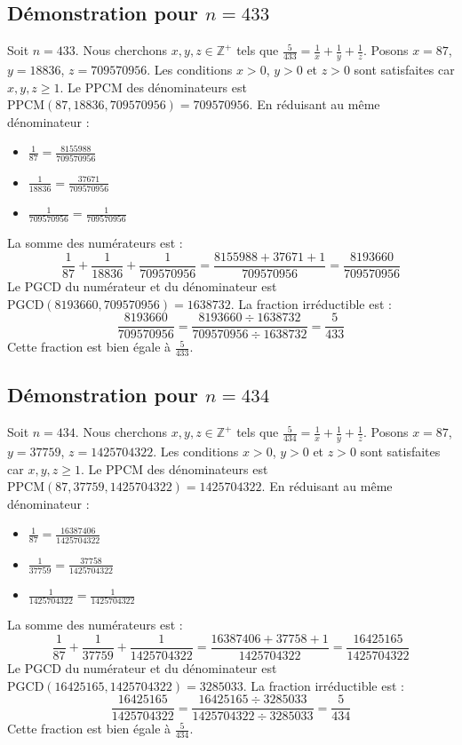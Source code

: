 \documentclass[11pt,a4paper]{article}
\begin{document}
\subsection{Démonstration pour $n = 433$}
Soit $n = 433$. Nous cherchons $x, y, z \in \mathbb{Z}^{+}$ tels que $\frac{5}{433} = \frac{1}{x} + \frac{1}{y} + \frac{1}{z}$.
Posons $x = 87$, $y = 18836$, $z = 709570956$.
Les conditions $x > 0$, $y > 0$ et $z > 0$ sont satisfaites car $x, y, z \geq 1$.
Le PPCM des dénominateurs est $\text{PPCM}(87, 18836, 709570956) = 709570956$.
En réduisant au même dénominateur :
\begin{itemize}
    \item $\frac{1}{87} = \frac{8155988}{709570956}$
    \item $\frac{1}{18836} = \frac{37671}{709570956}$
    \item $\frac{1}{709570956} = \frac{1}{709570956}$
\end{itemize}
La somme des numérateurs est :
$$ \frac{1}{87} + \frac{1}{18836} + \frac{1}{709570956} = \frac{8155988 + 37671 + 1}{709570956} = \frac{8193660}{709570956} $$
Le PGCD du numérateur et du dénominateur est $\text{PGCD}(8193660, 709570956) = 1638732$.
La fraction irréductible est :
$$ \frac{8193660}{709570956} = \frac{8193660 \div 1638732}{709570956 \div 1638732} = \frac{5}{433} $$
Cette fraction est bien égale à $\frac{5}{433}$.

\subsection{Démonstration pour $n = 434$}
Soit $n = 434$. Nous cherchons $x, y, z \in \mathbb{Z}^{+}$ tels que $\frac{5}{434} = \frac{1}{x} + \frac{1}{y} + \frac{1}{z}$.
Posons $x = 87$, $y = 37759$, $z = 1425704322$.
Les conditions $x > 0$, $y > 0$ et $z > 0$ sont satisfaites car $x, y, z \geq 1$.
Le PPCM des dénominateurs est $\text{PPCM}(87, 37759, 1425704322) = 1425704322$.
En réduisant au même dénominateur :
\begin{itemize}
    \item $\frac{1}{87} = \frac{16387406}{1425704322}$
    \item $\frac{1}{37759} = \frac{37758}{1425704322}$
    \item $\frac{1}{1425704322} = \frac{1}{1425704322}$
\end{itemize}
La somme des numérateurs est :
$$ \frac{1}{87} + \frac{1}{37759} + \frac{1}{1425704322} = \frac{16387406 + 37758 + 1}{1425704322} = \frac{16425165}{1425704322} $$
Le PGCD du numérateur et du dénominateur est $\text{PGCD}(16425165, 1425704322) = 3285033$.
La fraction irréductible est :
$$ \frac{16425165}{1425704322} = \frac{16425165 \div 3285033}{1425704322 \div 3285033} = \frac{5}{434} $$
Cette fraction est bien égale à $\frac{5}{434}$.
\end{document}
